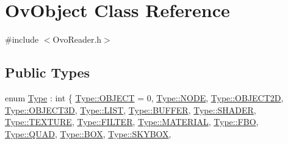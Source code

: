 \hypertarget{classOvObject}{}\section{Ov\+Object Class Reference}
\label{classOvObject}


{\ttfamily \#include $<$Ovo\+Reader.\+h$>$}

\subsection*{Public Types}
\begin{DoxyCompactItemize}
\item 
enum \hyperlink{classOvObject_a43751fbd68ebd5f7f02cb452b11e01c4}{Type} \+: int \{ \newline
\hyperlink{classOvObject_a43751fbd68ebd5f7f02cb452b11e01c4a8eee8e217391199668cbac89472ace53}{Type\+::\+O\+B\+J\+E\+CT} = 0, 
\hyperlink{classOvObject_a43751fbd68ebd5f7f02cb452b11e01c4a0cc25b606fe928a0c9a58f7f209c4495}{Type\+::\+N\+O\+DE}, 
\hyperlink{classOvObject_a43751fbd68ebd5f7f02cb452b11e01c4afb28ce4a9636089d093c7e779ae2c23b}{Type\+::\+O\+B\+J\+E\+C\+T2D}, 
\hyperlink{classOvObject_a43751fbd68ebd5f7f02cb452b11e01c4a9877ab4c625e2f67e1c007925520ff10}{Type\+::\+O\+B\+J\+E\+C\+T3D}, 
\newline
\hyperlink{classOvObject_a43751fbd68ebd5f7f02cb452b11e01c4a298cb25408234de02baf2085803a464a}{Type\+::\+L\+I\+ST}, 
\hyperlink{classOvObject_a43751fbd68ebd5f7f02cb452b11e01c4a17de626bcae5109bb2f7a66dfc4a8a1d}{Type\+::\+B\+U\+F\+F\+ER}, 
\hyperlink{classOvObject_a43751fbd68ebd5f7f02cb452b11e01c4aa05d35337eb28027e70aef2ea40ff1df}{Type\+::\+S\+H\+A\+D\+ER}, 
\hyperlink{classOvObject_a43751fbd68ebd5f7f02cb452b11e01c4a3f92f542bd9ec48f912b9350e22736ac}{Type\+::\+T\+E\+X\+T\+U\+RE}, 
\newline
\hyperlink{classOvObject_a43751fbd68ebd5f7f02cb452b11e01c4ae75ab17a550f46adbbe891b819cf951d}{Type\+::\+F\+I\+L\+T\+ER}, 
\hyperlink{classOvObject_a43751fbd68ebd5f7f02cb452b11e01c4ac740ce1ae95095daaa5eb2362f3151b3}{Type\+::\+M\+A\+T\+E\+R\+I\+AL}, 
\hyperlink{classOvObject_a43751fbd68ebd5f7f02cb452b11e01c4ab794765689021599d383933d5386652b}{Type\+::\+F\+BO}, 
\hyperlink{classOvObject_a43751fbd68ebd5f7f02cb452b11e01c4ac88da92039291f825814816096db2ea2}{Type\+::\+Q\+U\+AD}, 
\newline
\hyperlink{classOvObject_a43751fbd68ebd5f7f02cb452b11e01c4ae657cce1913c857166b0475f18668ef5}{Type\+::\+B\+OX}, 
\hyperlink{classOvObject_a43751fbd68ebd5f7f02cb452b11e01c4ae3d53ff832d50102618d4fd24ca85a85}{Type\+::\+S\+K\+Y\+B\+OX}, 

\end{DoxyCompactItemize}
